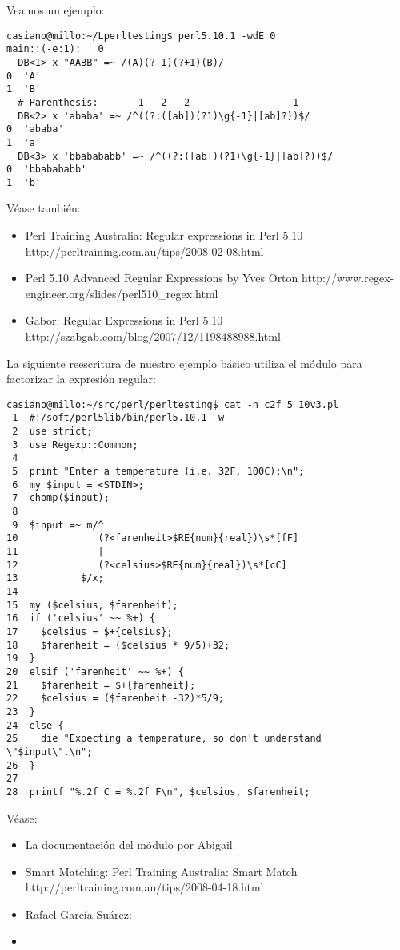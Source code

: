Veamos un ejemplo:

\begin{verbatim}
casiano@millo:~/Lperltesting$ perl5.10.1 -wdE 0
main::(-e:1):   0
  DB<1> x "AABB" =~ /(A)(?-1)(?+1)(B)/
0  'A'
1  'B'
  # Parenthesis:       1   2   2                  1
  DB<2> x 'ababa' =~ /^((?:([ab])(?1)\g{-1}|[ab]?))$/
0  'ababa'
1  'a'
  DB<3> x 'bbabababb' =~ /^((?:([ab])(?1)\g{-1}|[ab]?))$/
0  'bbabababb'
1  'b'
\end{verbatim}

Véase también:
\begin{itemize}
\item
\htmladdnormallink
{Perl Training Australia: Regular expressions in Perl 5.10}
{http://perltraining.com.au/tips/2008-02-08.html}
\item
\htmladdnormallink
{Perl 5.10 Advanced Regular Expressions by Yves Orton}
{http://www.regex-engineer.org/slides/perl510_regex.html}
\item
\htmladdnormallink
{Gabor: Regular Expressions in Perl 5.10}
{http://szabgab.com/blog/2007/12/1198488988.html}
\end{itemize}


La siguiente reescritura de nuestro ejemplo básico
utiliza el módulo  para factorizar
la expresión regular:

\begin{verbatim}
casiano@millo:~/src/perl/perltesting$ cat -n c2f_5_10v3.pl
 1  #!/soft/perl5lib/bin/perl5.10.1 -w
 2  use strict;
 3  use Regexp::Common;
 4
 5  print "Enter a temperature (i.e. 32F, 100C):\n";
 6  my $input = <STDIN>;
 7  chomp($input);
 8
 9  $input =~ m/^
10              (?<farenheit>$RE{num}{real})\s*[fF]
11              |
12              (?<celsius>$RE{num}{real})\s*[cC]
13           $/x;
14
15  my ($celsius, $farenheit);
16  if ('celsius' ~~ %+) {
17    $celsius = $+{celsius};
18    $farenheit = ($celsius * 9/5)+32;
19  }
20  elsif ('farenheit' ~~ %+) {
21    $farenheit = $+{farenheit};
22    $celsius = ($farenheit -32)*5/9;
23  }
24  else {
25    die "Expecting a temperature, so don't understand \"$input\".\n";
26  }
27
28  printf "%.2f C = %.2f F\n", $celsius, $farenheit;
\end{verbatim}

Véase:
\begin{itemize}
\item La documentación del módulo  por Abigail
\item Smart Matching: \htmladdnormallink
{Perl Training Australia: Smart Match}
{http://perltraining.com.au/tips/2008-04-18.html}
\item
Rafael García Suárez:
\item
{}
\end{itemize}


